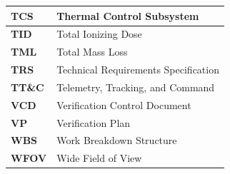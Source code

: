 {\begin{longtable}{|>{\raggedright\arraybackslash}p{3.2cm}|>{\raggedright\arraybackslash}p{12.1cm}|}
    \textbf{TCS}                      & Thermal Control Subsystem                         \\ \hline
    \textbf{TID}                      & Total Ionizing Dose                               \\ \hline
    \textbf{TML}                      & Total Mass Loss                                   \\ \hline
    \textbf{TRS}                      & Technical Requirements Specification              \\ \hline
    \textbf{TT\&C}                    & Telemetry, Tracking, and Command                  \\ \hline
    \textbf{VCD}                      & Verification Control Document                     \\ \hline
    \textbf{VP}                       & Verification Plan                                 \\ \hline
    \textbf{WBS}                      & Work Breakdown Structure                          \\ \hline
    \textbf{WFOV}                     & Wide Field of View                                \\ \hline
\end{longtable}\addtocounter{table}{-1}}
